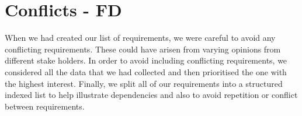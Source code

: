 \documentclass[12pt]{report}
\begin{document}
\section{Conflicts - FD}

When we had created our list of requirements, we were careful to avoid any conflicting requirements. These could have arisen from varying opinions from different stake holders. In order to avoid including conflicting requirements, we considered all the data that we had collected and then prioritised the one with the highest interest. Finally, we split all of our requirements into a structured indexed list to help illustrate dependencies and also to avoid repetition or conflict between requirements.

{}

\end{document}
